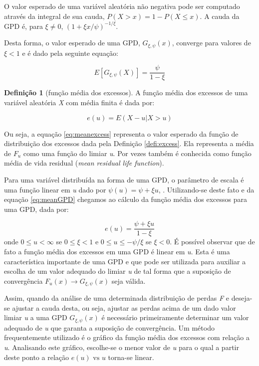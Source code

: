 \documentclass[1p]{elsarticle}
\theoremstyle{definition}
\newtheorem{defi}[teor]{Definição}
\begin{document}
O valor esperado de uma variável aleatória não negativa pode ser computado através da integral de sua cauda, $P(X>x) = 1-P(X \leq x)$. A cauda da GPD é, para $\xi \neq 0$, $\left(1+\xi x / \psi \right)^{-1/ \xi}$.

Desta forma, o valor esperado de uma GPD, $G_{\xi,\psi}(x)$, converge para valores de $\xi<1$ e é dado pela seguinte equação:

\begin{equation}
\label{eq:meanGPD}
E\left[G_{\xi,\psi} (X) \right]=\frac{\psi}{1-\xi}
\end{equation}


\begin{defi}[função média dos excessos]
	\label{defi:meanexcess}
	A função média dos excessos de uma variável aleatória \emph{X} com média finita é dada por:

	\begin{equation}
	\label{eq:meanexcess}
	e(u)=E\left(X-u | X > u\right)
	\end{equation}
\end{defi}

Ou seja, a equação \eqref{eq:meanexcess} representa o valor esperado da função de distribuição dos excessos dada pela Definição \ref{defi:excess}. Ela representa a média de $F_u$ como uma função do limiar \emph{u}. Por vezes também é conhecida como função média de vida residual (\emph{mean residual life function}).

Para uma variável distribuída na forma de uma GPD, o parâmetro de escala é uma função linear em \emph{u} dado por $\psi(u)=\psi + \xi u$, \cite[Teorema 3.4.13(e)]{Embrechts1997}. Utilizando-se deste fato e da equação \eqref{eq:meanGPD} chegamos ao cálculo da função média dos excessos para uma GPD, dada por:

\begin{equation}
\label{eq:eu}
e(u)=\frac{\psi+\xi u}{1-\xi}
\end{equation}
onde $0 \leq u < \infty$ se $0 \leq \xi <1$ e $0 \leq u \leq -\psi / \xi$ se $\xi < 0$. É possível observar que de fato a função média dos excessos em uma GPD é linear em \emph{u}. Esta é uma característica importante de uma GPD e que pode ser utilizada para auxiliar a escolha de um valor adequado do limiar \emph{u} de tal forma que a suposição de convergência $F_u(x) \rightarrow G_{\xi, \psi}(x)$ seja válida.

Assim, quando da análise de uma determinada distribuição de perdas \emph{F} e deseja-se ajustar a cauda desta, ou seja, ajustar as perdas acima de um dado valor limiar \emph{u} a uma GPD $G_{\xi, \psi}(x)$ é necessário primeiramente determinar um valor adequado de \emph{u} que garanta a suposição de convergência. Um método frequentemente utilizado é o gráfico da função média dos excessos com relação a \emph{u}. Analisando este gráfico, escolhe-se o menor valor de \emph{u} para o qual a partir deste ponto a relação $e(u) \text{ vs } u$ torna-se linear.
\end{document}
